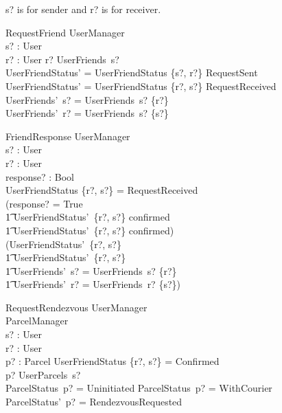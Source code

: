 \documentclass{article}
\begin{document}
s? is for sender and r? is for receiver.\\

\begin{schema}{RequestFriend}
	\Delta UserManager\\
	s? : User\\
	r? : User
	\where
	r? \notin UserFriends~s?\\
	UserFriendStatus' = UserFriendStatus \cup \{s?, r?\} \mapsto RequestSent\\
	UserFriendStatus' = UserFriendStatus \cup \{r?, s?\} \mapsto RequestReceived\\
	UserFriends'~s? = UserFriends~s? \cup \{r?\}\\
	UserFriends'~r? = UserFriends~s? \cup \{s?\}
\end{schema}

\begin{schema}{FriendResponse}
	\Delta UserManager\\
	s? : User\\
	r? : User\\
	response? : Bool\\
	\where
	UserFriendStatus \{r?, s?\} = RequestReceived\\
	(response? = True \land\\ 
		\t1 UserFriendStatus'~\{r?, s?\} \mapsto confirmed \land\\ 
		\t1 UserFriendStatus'~\{r?, s?\} \mapsto confirmed)\\
	\lor (UserFriendStatus'~\{r?, s?\} \mapsto \emptyset \land\\ 
		\t1 UserFriendStatus'~\{r?, s?\} \mapsto \emptyset \land\\
		\t1 UserFriends'~s? = UserFriends~s? \setminus \{r?\} \land\\
		\t1 UserFriends'~r? = UserFriends~r? \setminus \{s?\})
\end{schema}

\begin{schema}{RequestRendezvous}
	\Delta UserManager\\
	\Delta ParcelManager\\
	s? : User\\
	r? : User\\
	p? : Parcel
	\where
	UserFriendStatus \{r?, s?\} = Confirmed\\
	p? \in UserParcels~s?\\
	ParcelStatus~p? = Uninitiated \lor ParcelStatus~p? = WithCourier\\
	ParcelStatus'~p? = RendezvousRequested
\end{schema}
\end{document}
